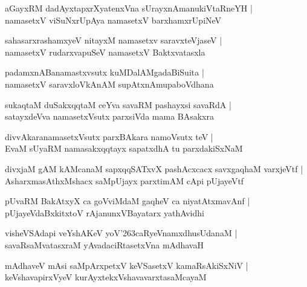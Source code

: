 \documentclass[twoside,12pt,openright]{book}
\def\S{\char'263}
\newcounter{shloka}[chapter]
\begin{document}
\begin{shloka}%
aGayxRM dadAyxtapxrXyatenxVna sUrayxnAmanukiVtaRneYH |\\
namasetxV viSuNxrUpAya namasetxV barxhamxrUpiNeV
\end{shloka}

\begin{shloka}%
sahasarxrashamxyeV nitayxM namasetxv saravxteVjaseV |\\
namasetxV rudarxvapuSeV namasetxV Baktxvatasxla 
\end{shloka}

\begin{shloka}%
padamxnABanamastxvsutx kuMDalAMgadaBiSuita |\\
namasetxV saravxloVkAnAM  supAtxnAmupaboVdhana
\end{shloka}

\begin{shloka}%
sukaqtaM duSakxqqtaM ceYva savaRM pashayxsi savaRdA |\\
satayxdeVva namasetxVsutx parxsiVda mama BAsakxra
\end{shloka}

\begin{shloka}%
divvAkaranamasetxVsutx parxBAkara namoVsutx teV |\\
EvaM sUyaRM namasakxqqtayx sapatxdhA tu parxdakiSxNaM 
\end{shloka}

\begin{shloka}%
divxjaM gAM kAMcanaM sapxqqSATxvX pashAcxcacx savxgaqhaM varxjeVtf |\\
AsharxmasAthxMshacx saMpUjayx parxtimAM cApi pUjayeVtf
\end{shloka}

\begin{shloka}%
pUvaRM BakAtxyX ca goVviMdaM gaqheV ca niyatAtxmavAnf |\\
pUjayeVdaBxkitxtoV rAjanunxVBayatarx yathAvidhi
\end{shloka}

\begin{shloka}%
visheVSAdapi veYshAKeV yoV\S caRyeVnamxdhusUdanaM |\\
savaRsaMvatasxraM yAvadaciRtasetxVna mAdhavaH 
\end{shloka}

\begin{shloka}%
mAdhaveV mAsi saMpArxpetxV keVSasetxV kamaRsAkiSxNiV |\\
keVshavapirxVyeV kurAyxtekxVshavavarxtasaMcayaM 
\end{shloka}
\end{document}

